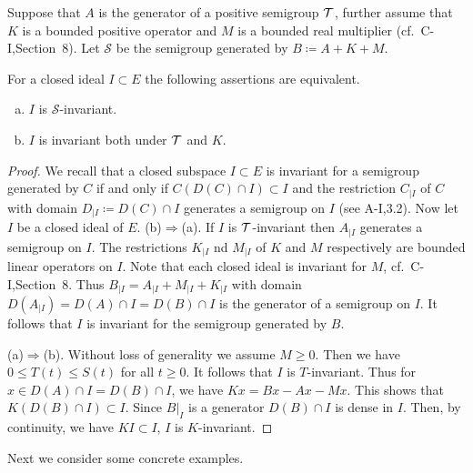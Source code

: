 \begin{proposition}\label{prop:c3-3.3}
	Suppose that $A$ is the generator of a positive semigroup $\mathcal{T}$, further assume that $K$ is a bounded positive operator and $M$ is a bounded real multiplier (cf.\ C-I,Section~8).
	Let $\mathcal{S}$ be the semigroup generated by $B \coloneqq A + K + M$.
	
	For a closed ideal $I \subset E$ the following assertions are equivalent.
	\begin{enumerate}[(a)]
		\item 
		$I$ is $\mathcal{S}$-invariant.
	
		\item 
		$I$ is invariant both under $\mathcal{T}$ and $K$.
	\end{enumerate}
\end{proposition}

\begin{proof}
We recall that a closed subspace $I \subset E$ is invariant for a semigroup generated by $C$ if and only if $C(D(C)\cap I) \subset I$ and the restriction $C_{|I}$ of $C$ with domain $D_{|I} \coloneqq D(C)\cap I$ generates a semigroup on $I$ (see A-I,3.2).
Now let $I$ be a closed ideal of $E$.
%
%
(b)$\Rightarrow$(a).
If $I$ is $\mathcal{T}$-invariant then $A_{|I}$ generates a semigroup on $I$.
The restrictions $K_{|I}$ nd $M_{|I}$ of $K$ and $M$ respectively are bounded linear operators on $I$.
Note that each closed ideal is invariant for $M$, cf.\ C-I,Section~8.
Thus $B_{|I} = A_{|I} + M_{|I} + K_{|I}$ with domain $D(A_{|I}) = D(A)\cap I = D(B)\cap I$ is the generator of a semigroup on $I$.
It follows that $I$ is invariant for the semigroup generated by $B$.

(a)$\Rightarrow$(b).
Without loss of generality we assume $M \geq 0$.
Then we have $0 \leq T(t) \leq S(t)$ for all $t \geq 0$.
It follows that $I$ is $T$-invariant.
Thus for $x \in D(A)\cap I = D(B)\cap I$, we have $Kx = Bx - Ax - Mx$.
This shows that $K(D(B)\cap I) \subset I$.
Since $B|_{I}$ is a generator $D(B)\cap I$ is dense in $I$.
Then, by continuity, we have $KI \subset I$, \ie  $I$ is $K$-invariant.
\end{proof}

Next we consider some concrete examples.

